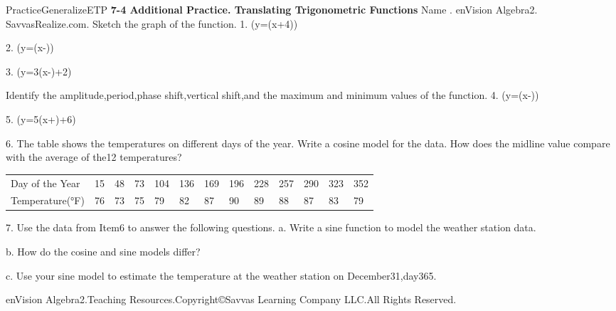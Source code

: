 \documentclass{article}
\newenvironment{te-addendum}[2]{}{}     %
\newcommand{\answer}[1]{}               %
\newcommand{\placeholder}[2]{}          %
\begin{document}
\begin{te-addendum}{Practice}{GeneralizeETP}
\textbf{7-4 Additional Practice. Translating Trigonometric Functions}
Name \underline{\hspace{2cm}}. enVision Algebra2. SavvasRealize.com.
Sketch the graph of the function.
1. (y=\cos(x+4))
\answer{Graph shown.}
\placeholder{graph}{Magenta cos(x+4),arrowed x,y axes,O,unit xgrid labels-4,-2,2,4; ygrid1/2 labels-2,-1,1,2,window-5..5,-5/2..5/2. Max(-4,1),(2.28,1),min(-.86,-1),curvearrows.}
2. (y=(x-\frac{}))
\answer{Graph shown.}
\placeholder{graph}{Magenta sin2(x-pi/3),arrowed x,y axes,O; x unitgrid labels-4,-2,2,4; yhalfunitgrid labels-2,-1,1,2,window-5..5,-5/2..5/2. Amplitude1 periodpi,max1.83+kpi,min.26+kpi,arrows.}
3. (y=3\sin(x-\frac{})+2)
\answer{Graph shown.}
\placeholder{graph}{Magenta3sin(x-pi/4)+2,arrowed x,y axes,O; unitgrid x,y; x labels-4,-2,2,4;ylabels2,4,6,window-5..5,-2..8. Max(2.36,5),min(-.79,-1),end arrows.}
Identify the amplitude,period,phase shift,vertical shift,and the maximum and minimum values of the function.
4. (y=\sin(x-\frac{}))
\answer{period:(2\pi);amplitude:(1/2);phase shift:(pi/2);vertical shift:0;max:0.5,min:-0.5}
5. (y=5(x+\pi)+6)
\answer{period:(2\pi/3);amplitude:5;phase shift:(-\pi);vertical shift:6;max:11,min:1}
6. The table shows the temperatures on different days of the year. Write a cosine model for the data. How does the midline value compare with the average of the12 temperatures?
\answer{(y\approx8.5\cos\frac{2\pi}{365}(x-196)+81.5);The average temp is close to the midline value.}
\begin{tabular}{lllllllllllll}
Day of the Year & 15 & 48 & 73 & 104 & 136 & 169 & 196 & 228 & 257 & 290 & 323 & 352 \\
Temperature(°F) & 76 & 73 & 75 & 79 & 82 & 87 & 90 & 89 & 88 & 87 & 83 & 79 \\
\end{tabular}
7. Use the data from Item6 to answer the following questions.
a. Write a sine function to model the weather station data.
\answer{Sample:(y=8.5\sin(\frac{2\pi}{365}(x-196)+\frac\pi2)+81.5)}
b. How do the cosine and sine models differ?
\answer{The sine model has a different phase shift compared to its parent function than the cosine model does.}
c. Use your sine model to estimate the temperature at the weather station on December31,day365.
\answer{about73°F}
enVision Algebra2.Teaching Resources.Copyright©Savvas Learning Company LLC.All Rights Reserved.
\end{te-addendum}
\end{document}
